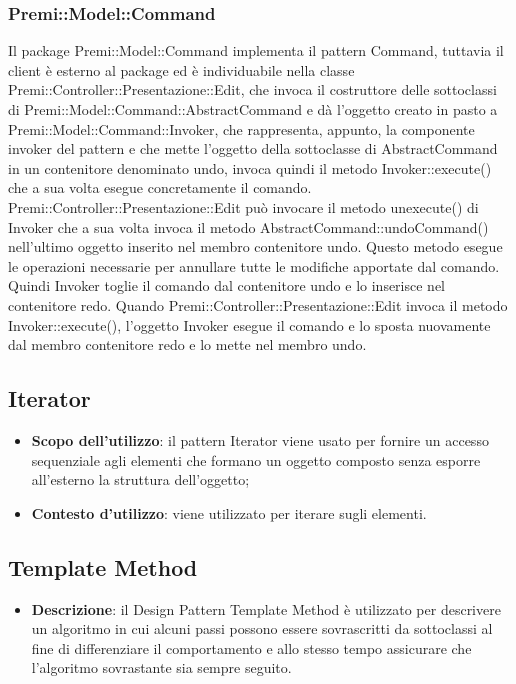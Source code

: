 {{		\subsubsection{Premi::Model::Command}{
			Il package Premi::Model::Command implementa il pattern Command, tuttavia il client è esterno al package ed è individuabile nella classe Premi::Controller::Presentazione::Edit, che invoca il costruttore delle sottoclassi di Premi::Model::Command::AbstractCommand e dà l'oggetto creato in pasto a Premi::Model::Command::Invoker, che rappresenta, appunto, la componente invoker del pattern e che mette l'oggetto della sottoclasse di AbstractCommand in un contenitore denominato undo, invoca quindi il metodo Invoker::execute() che a sua volta esegue concretamente il comando.\\
			Premi::Controller::Presentazione::Edit può invocare il metodo unexecute() di Invoker che a sua volta invoca il metodo AbstractCommand::undoCommand() nell'ultimo oggetto inserito nel membro contenitore undo. Questo metodo esegue le operazioni necessarie per annullare tutte le modifiche apportate dal comando. Quindi Invoker toglie il comando dal contenitore undo e lo inserisce nel contenitore redo. Quando Premi::Controller::Presentazione::Edit invoca il metodo Invoker::execute(), l'oggetto Invoker esegue il comando e lo sposta nuovamente dal membro contenitore redo e lo mette nel membro undo.    
		}
	}
	\subsection{Iterator}{
		\begin{itemize}
			\item \textbf{Scopo dell’utilizzo}: il pattern Iterator viene usato per fornire un accesso sequenziale agli elementi che formano un oggetto composto senza esporre all’esterno la struttura dell’oggetto;
			\item \textbf{Contesto d’utilizzo}: viene utilizzato per iterare sugli elementi.
		\end{itemize}
	}
	\subsection{Template Method}{
		\begin{itemize}
			\item \textbf{Descrizione}: il Design Pattern Template Method è utilizzato per descrivere un algoritmo in cui alcuni passi possono essere sovrascritti da sottoclassi al fine di differenziare il comportamento e allo stesso tempo assicurare che l'algoritmo sovrastante sia sempre seguito.\\
			

\end{itemize}}}
